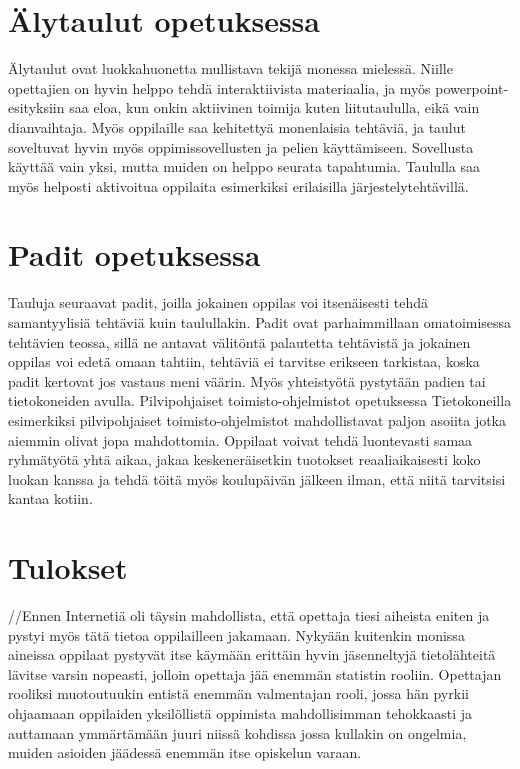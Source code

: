 \documentclass[utf8,bachelor]{gradu3}
\begin{document}

\section{Älytaulut opetuksessa}
Älytaulut ovat luokkahuonetta mullistava tekijä monessa mielessä. Niille opettajien on hyvin helppo tehdä interaktiivista materiaalia, ja myös powerpoint-esityksiin saa eloa, kun onkin aktiivinen toimija kuten liitutaululla, eikä vain dianvaihtaja. Myös oppilaille saa kehitettyä monenlaisia tehtäviä, ja taulut soveltuvat hyvin myös oppimissovellusten ja pelien käyttämiseen. Sovellusta käyttää vain yksi, mutta muiden on helppo seurata tapahtumia. Taululla saa myös helposti aktivoitua oppilaita esimerkiksi erilaisilla järjestelytehtävillä.

\section{Padit opetuksessa}
Tauluja seuraavat padit, joilla jokainen oppilas voi itsenäisesti tehdä samantyylisiä tehtäviä kuin taulullakin. Padit ovat parhaimmillaan omatoimisessa tehtävien teossa, sillä ne antavat välitöntä palautetta tehtävistä ja jokainen oppilas voi edetä omaan tahtiin, tehtäviä ei tarvitse erikseen tarkistaa, koska padit kertovat jos vastaus meni väärin. Myös yhteistyötä pystytään padien tai tietokoneiden avulla.
Pilvipohjaiset toimisto-ohjelmistot opetuksessa
Tietokoneilla esimerkiksi pilvipohjaiset toimisto-ohjelmistot mahdollistavat paljon asoiita jotka aiemmin olivat jopa mahdottomia. Oppilaat voivat tehdä luontevasti samaa ryhmätyötä yhtä aikaa, jakaa keskeneräisetkin tuotokset reaaliaikaisesti koko luokan kanssa ja tehdä töitä myös koulupäivän jälkeen ilman, että niitä tarvitsisi kantaa kotiin.


\section{Tulokset}
//Ennen Internetiä oli täysin mahdollista, että opettaja tiesi aiheista eniten ja pystyi myös tätä tietoa oppilailleen jakamaan. Nykyään kuitenkin monissa aineissa oppilaat pystyvät itse käymään erittäin hyvin jäsenneltyjä tietolähteitä lävitse varsin nopeasti, jolloin opettaja jää enemmän statistin rooliin. Opettajan rooliksi muotoutuukin entistä enemmän valmentajan rooli, jossa hän pyrkii ohjaamaan oppilaiden yksilöllistä oppimista mahdollisimman tehokkaasti ja auttamaan ymmärtämään juuri niissä kohdissa jossa kullakin on ongelmia, muiden asioiden jäädessä enemmän itse opiskelun varaan.
\end{document}
